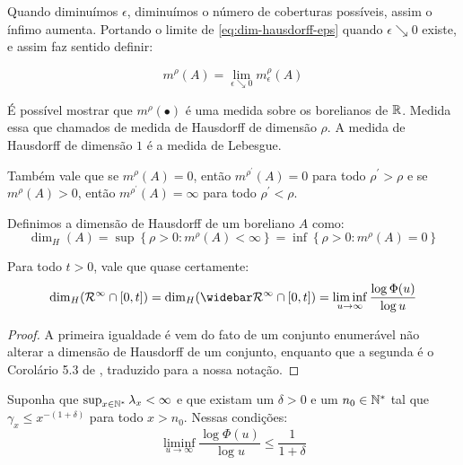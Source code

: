 Quando diminuímos $\epsilon$, diminuímos o número de coberturas
possíveis, assim o ínfimo aumenta. Portando o limite de
\eqref{eq:dim-hausdorff-eps} quando $\epsilon \searrow 0$ existe, e
assim faz sentido definir:

\begin{displaymath}
  m^\rho(A) = \lim_{\epsilon \searrow 0} m^\rho_\epsilon (A)
\end{displaymath}

É possível mostrar que $m^\rho(\bullet)$ é uma medida sobre os
borelianos de ${\mathbb{R}}$. Medida essa que chamados de medida de Hausdorff de
dimensão $\rho$.  A medida de Hausdorff de dimensão $1$ é a medida de
Lebesgue.

Também vale que se $m^\rho(A) = 0$, então $m^{\rho^\prime}(A) = 0$ para
todo $\rho^\prime > \rho$ e se $m^\rho(A) > 0$, então $m^{\rho^\prime}(A)
= \infty$ para todo $\rho^\prime < \rho$.

\begin{definicao}
  Definimos a dimensão de Hausdorff de um boreliano $A$ como:
  \begin{displaymath}
    \dim_H(A) = \sup \left\{ \rho > 0 : m^\rho(A) < \infty \right\}
    = \inf \left\{ \rho > 0: m^\rho(A) = 0 \right\}
  \end{displaymath}
\end{definicao}

\begin{teorema}
  \label{teo:dim-hausdorff}
  Para todo $t > 0$, vale que quase certamente:
  \begin{equation}
    \label{eq:dim-hausdorff}
    \dim_H(\RR^\infty \cap [0, t]) = 
    \dim_H(\RRb^\infty \cap [0, t]) =
    \liminf_{u \to \infty} \frac{\log \Phi(u)}{\log u}
  \end{equation}
\end{teorema}
\begin{proof}
  A primeira igualdade é vem do fato de um conjunto enumerável não
  alterar a dimensão de Hausdorff de um conjunto, enquanto que a
  segunda é o Corolário 5.3 de \cite{bertoin:97}, traduzido para a
  nossa notação.
\end{proof}

\begin{proposicao}
  \label{prop:dominar-dim-haus-sup}
  Suponha que $\sup_{x\in{\mathbb{N^*}}}\lambda_x < \infty$ e que existam um
  $\delta>0$ e um $n_0 \in {\mathbb{N^*}}$ tal que $\gamma_x \leq x^{-(1+\delta)}$
  para todo $x > n_0$. Nessas condições:
  \begin{equation}
    \liminf_{u \to \infty} \frac{\log \Phi(u)}{\log u}  \leq \frac{1}{1+\delta}
  \end{equation}
\end{proposicao}

